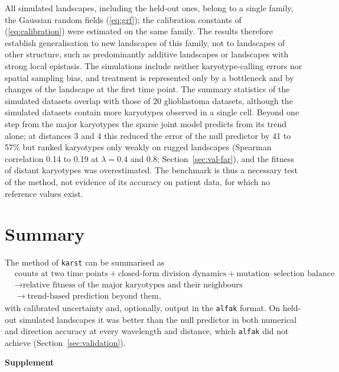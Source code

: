 \documentclass[11pt]{article}
\begin{document}
All simulated landscapes, including the held-out ones, belong to a single
family, the Gaussian random fields (\ref{eq:grf}); the calibration constants
of (\ref{eq:calibration}) were estimated on the same family. The results
therefore establish generalisation to new landscapes of this family, not to
landscapes of other structure, such as predominantly additive landscapes or
landscapes with strong local epistasis. The simulations include neither
karyotype-calling errors nor spatial sampling bias, and treatment is
represented only by a bottleneck and by changes of the landscape at the first
time point. The summary statistics of the simulated datasets overlap with those of
20 glioblastoma datasets, although the simulated datasets contain more
karyotypes observed in a single cell. Beyond one step from the major
karyotypes the sparse joint model predicts from its trend alone; at distances
3 and 4 this reduced the error of the null predictor by 41 to 57\% but ranked
karyotypes only weakly on rugged landscapes (Spearman correlation 0.14 to
0.19 at $\lambda=0.4$ and 0.8; Section~\ref{sec:val-far}), and the fitness of
distant karyotypes was overestimated. The benchmark is thus a necessary test
of the method, not evidence of its accuracy on patient data, for which no
reference values exist.

\section{Summary}

The method of \texttt{karst} can be summarised as
\[
\begin{aligned}
&\text{counts at two time points}
+ \text{closed-form division dynamics}
+ \text{mutation--selection balance}\\
&\longrightarrow
\text{relative fitness of the major karyotypes and their neighbours}\\
&\longrightarrow
\text{trend-based prediction beyond them},
\end{aligned}
\]
with calibrated uncertainty and, optionally, output in the \texttt{alfak}
format. On held-out simulated landscapes it was better than the null
predictor in both numerical and direction accuracy at every wavelength and
distance, which \texttt{alfak} did not achieve
(Section~\ref{sec:validation}).

\clearpage
\sloppy
\appendix
\renewcommand{\thesection}{S\arabic{section}}
\renewcommand{\theequation}{S\arabic{equation}}
\setcounter{equation}{0}
\begin{center}
{\Large\bfseries Supplement}
\end{center}
\end{document}
